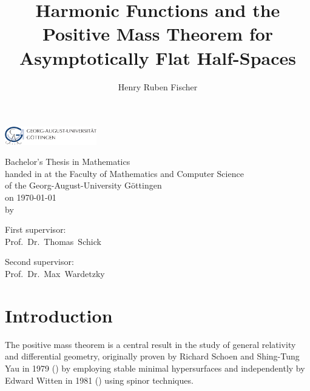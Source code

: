 \documentclass[titlepage,numbers=noenddot,oneside,%
cleardoublepage=empty,paper=a4,fontsize=11pt,%
english,%
]{scrartcl}
\title{Harmonic Functions and the Positive Mass Theorem for Asymptotically Flat Half-Spaces}
\author{Henry Ruben Fischer}
\begin{document}
\theoremstyle{plain}
\makeatletter
\begin{titlepage}
\begin{center}

\textsc{\LARGE \@title}

\vspace{2cm}

\includegraphics[width=0.3\textwidth]{Logo.pdf}

\vspace{1.5cm}

\Large Bachelor's Thesis in Mathematics \\
\Large handed in at the Faculty of Mathematics and Computer Science\\
\Large of the Georg-August-University Göttingen\\
on \today\\

\vspace{1cm}
\small{by}\\

\large{\@author}
\vspace{1cm}

\small{First supervisor:}\\

\large{Prof.~Dr.~Thomas~Schick}

\vspace{1cm}

\small{Second supervisor:}\\

\large{Prof.~Dr.~Max~Wardetzky}

\end{center}
\end{titlepage}
\makeatother

\tableofcontents
\newpage
{}
\section{Introduction}


The positive mass theorem is a central result in the study of general relativity and differential geometry, originally proven by Richard Schoen and Shing-Tung Yau in 1979 (\cite{schoenProofPositiveMass1979}) by employing stable minimal hypersurfaces and independently by Edward Witten in 1981 (\cite{wittenNewProofPositive1981}) using spinor techniques.
\end{document}
